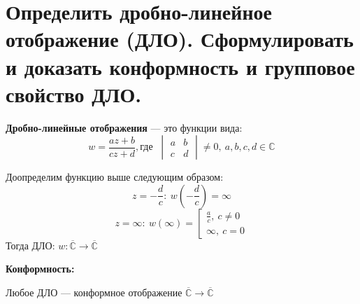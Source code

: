 \newpage
\section{Определить дробно-линейное отображение (ДЛО). Сформулировать и доказать конформность и групповое свойство ДЛО.}


\textbf{Дробно-линейные отображения} --- это функции вида: $$w=\frac{az+b}{cz+d}, \text{где } \ \begin{vmatrix}
    a&b\\
    c&d
\end{vmatrix} \neq 0, \ a,b,c,d\in \mathbb{C}$$

Доопределим функцию выше следующим образом:$$z=-\frac{d}{c}: \ w(-\frac{d}{c}) = \infty$$
$$z = \infty: \ w(\infty) = \left[\begin{gathered}\frac{a}{c}, \ c\neq 0\\
\infty, \ c=0
\end{gathered}
\right.$$
Тогда ДЛО: $w: \overline{\mathbb{C}}\to \overline{\mathbb{C}}$


\textbf{Конформность:}

Любое ДЛО --- конформное отображение $\overline{\mathbb{C}}\to \overline{\mathbb{C}}$

